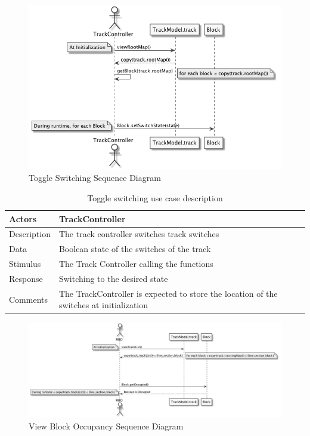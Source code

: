 \documentclass[]{article}
\begin{document}
\begin{figure}[H]
	\centering
	\includegraphics[scale=.5]{switching.png}
	\caption{Toggle Switching Sequence Diagram}
\end{figure}
\begin{table}[H]
	\centering
	\caption{Toggle switching use case description}
	\begin{tabular}{|l|l|}
		\hline
		Actors & \parbox[t]{10cm}{TrackController} \\ \hline
		Description & \parbox[t]{10cm}{The track controller switches track switches} \\ \hline
		Data &  \parbox[t]{10cm}{Boolean state of the switches of the track} \\ \hline
		Stimulus &  \parbox[t]{10cm}{The Track Controller calling the functions} \\ \hline
		Response & \parbox[t]{10cm}{Switching to the desired state}\\ \hline
		Comments & \parbox[t]{10cm}{The TrackController is expected to store the location of the switches at initialization}  \\ \hline
	\end{tabular}
\end{table}

\begin{figure}[H]
	\centering
	\includegraphics[width=\textwidth]{viewBlockOccupancy.png}
	\caption{View Block Occupancy Sequence Diagram}
\end{figure}
\end{document}
